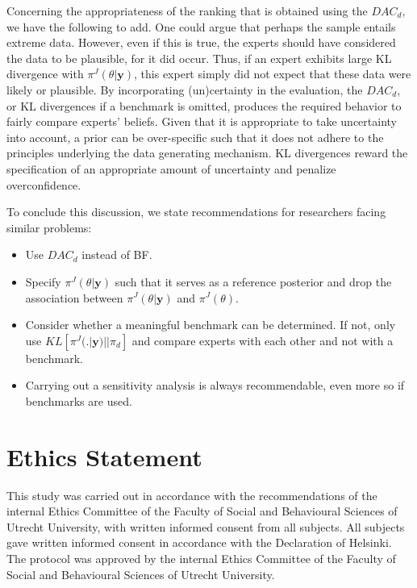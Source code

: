 \documentclass[openright,titlepage,12pt,a4paper]{book}
\providecommand{\tightlist}{%
  \setlength{\itemsep}{0pt}\setlength{\parskip}{0pt}}
\begin{document}
Concerning the appropriateness of the ranking that is obtained using the \(DAC_d\), we have the following to add. One could argue that perhaps the sample entails extreme data. However, even if this is true, the experts should have considered the data to be plausible, for it did occur. Thus, if an expert exhibits large KL divergence with \(\pi^J(\theta|\textbf{y})\), this expert simply did not expect that these data were likely or plausible. By incorporating (un)certainty in the evaluation, the \(DAC_d\), or KL divergences if a benchmark is omitted, produces the required behavior to fairly compare experts' beliefs. Given that it is appropriate to take uncertainty into account, a prior can be over-specific such that it does not adhere to the principles underlying the data generating mechanism. KL divergences reward the specification of an appropriate amount of uncertainty and penalize overconfidence.

\newpage

To conclude this discussion, we state recommendations for researchers facing similar problems:

\begin{itemize}
\tightlist
\item
  Use \(DAC_d\) instead of BF.
\item
  Specify \(\pi^J(\theta|\textbf{y})\) such that it serves as a reference posterior and drop the association between \(\pi^J(\theta|\textbf{y})\) and \(\pi^J(\theta)\).
\item
  Consider whether a meaningful benchmark can be determined. If not, only use \(KL[\pi^J(.|\textbf{y})||\pi_d]\) and compare experts with each other and not with a benchmark.
\item
  Carrying out a sensitivity analysis is always recommendable, even more so if benchmarks are used.
\end{itemize}

\hypertarget{ch03ethics}{%
\section*{Ethics Statement}\label{ch03ethics}}

This study was carried out in accordance with the recommendations of the internal Ethics Committee of the Faculty of Social and Behavioural Sciences of Utrecht University, with written informed consent from all subjects. All subjects gave written informed consent in accordance with the Declaration of Helsinki. The protocol was approved by the internal Ethics Committee of the Faculty of Social and Behavioural Sciences of Utrecht University.
\end{document}
